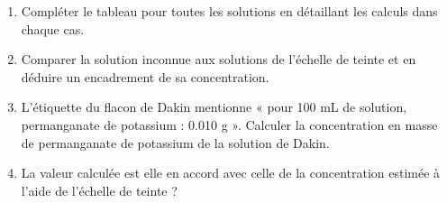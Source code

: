 \documentclass[a4paper,11pt,fleqn]{article}%
\begin{document}
\noindent
{}
\begin{enumerate}
	\item Compléter le tableau pour toutes les solutions en détaillant les calculs dans chaque cas.
	\item Comparer la solution inconnue aux solutions de l’échelle de teinte et en déduire un encadrement de sa concentration.
	\item L’étiquette du flacon de Dakin mentionne « pour 100 mL de solution, permanganate de potassium : \num{0,010} \unit{\gram} ». Calculer la concentration en masse de permanganate de potassium de la solution de Dakin.
	\item La valeur calculée est elle en accord avec celle de la concentration estimée à l’aide de l’échelle de teinte ?
\end{enumerate}
\end{document}
